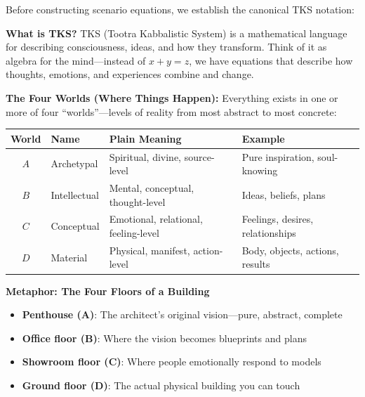 \documentclass[11pt,twoside]{book}
\begin{document}
Before constructing scenario equations, we establish the canonical TKS notation:

\begin{tcolorbox}[colback=blue!5!white,colframe=blue!65!black,title=\textbf{Plain English: Understanding TKS Building Blocks},breakable]

\textbf{What is TKS?}
TKS (Tootra Kabbalistic System) is a mathematical language for describing consciousness, ideas, and how they transform. Think of it as algebra for the mind---instead of $x + y = z$, we have equations that describe how thoughts, emotions, and experiences combine and change.

\textbf{The Four Worlds (Where Things Happen):}
Everything exists in one or more of four ``worlds''---levels of reality from most abstract to most concrete:

\begin{center}
\footnotesize
\begin{tabularx}{\textwidth}{c|l|X|X}
\toprule
\textbf{World} & \textbf{Name} & \textbf{Plain Meaning} & \textbf{Example} \\
\midrule
$A$ & Archetypal & Spiritual, divine, source-level & Pure inspiration, soul-knowing \\
$B$ & Intellectual & Mental, conceptual, thought-level & Ideas, beliefs, plans \\
$C$ & Conceptual & Emotional, relational, feeling-level & Feelings, desires, relationships \\
$D$ & Material & Physical, manifest, action-level & Body, objects, actions, results \\
\bottomrule
\end{tabularx}
\end{center}

\textbf{Metaphor: The Four Floors of a Building}
\begin{itemize}
    \item \textbf{Penthouse (A)}: The architect's original vision---pure, abstract, complete
    \item \textbf{Office floor (B)}: Where the vision becomes blueprints and plans
    \item \textbf{Showroom floor (C)}: Where people emotionally respond to models
    \item \textbf{Ground floor (D)}: The actual physical building you can touch
\end{itemize}


\end{tcolorbox}
\end{document}
